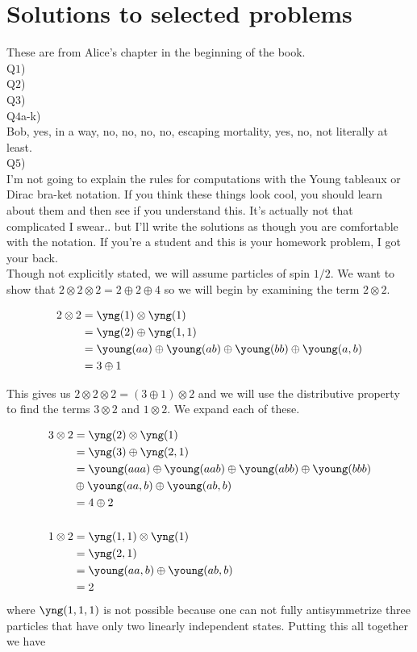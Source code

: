
\chapter*{Solutions to selected problems}
These are from Alice's chapter in the beginning of the book.\\

Q$1$)\\

Q$2$)\\

Q$3$)\\

Q$4$a-k)\\
Bob, yes, in a way, no, no, no, no, escaping mortality, yes, no, not literally at least.\\

Q$5$)\\
I'm not going to explain the rules for computations with the Young tableaux or Dirac bra-ket notation. If you think these things look cool, you should learn about them and then see if you understand this. It's actually not that complicated I swear.. but I'll write the solutions as though you are comfortable with the notation. If you're a student and this is your homework problem, I got your back.\\

Though not explicitly stated, we will assume particles of spin $1/2$. We want to show that $2\otimes 2\otimes 2 = 2\oplus 2 \oplus 4$ so we will begin by examining the term $2\otimes 2$.

\begin{align*}
2\otimes 2 &= \yng(1)\otimes\yng(1)\\
           &= \yng(2)\oplus\yng(1,1)\\
           &= \young(aa)\oplus\young(ab)\oplus\young(bb)\oplus\young(a,b)\\
           &= 3\oplus 1 
\end{align*}

This gives us $2\otimes 2\otimes 2 = (3\oplus 1) \otimes 2$ and we will use the distributive property to find the terms $3\otimes 2$ and $1\otimes 2$. We expand each of these.

\begin{align*}
3\otimes 2 &= \yng(2)\otimes\yng(1)\\
           &= \yng(3)\oplus\yng(2,1)\\
           &= \young(aaa)\oplus\young(aab)\oplus\young(abb)\oplus\young(bbb)\\
           &\oplus \young(aa,b)\oplus\young(ab,b)\\
           &= 4\oplus 2 \\
~\\
1\otimes 2 &= \yng(1,1)\otimes\yng(1)\\
           &= \yng(2,1)\\
           &= \young(aa,b)\oplus\young(ab,b)\\
           &= 2
\end{align*}
where $\yng(1,1,1)$ is not possible because one can not fully antisymmetrize three particles that have only two linearly independent states. Putting this all together we have

